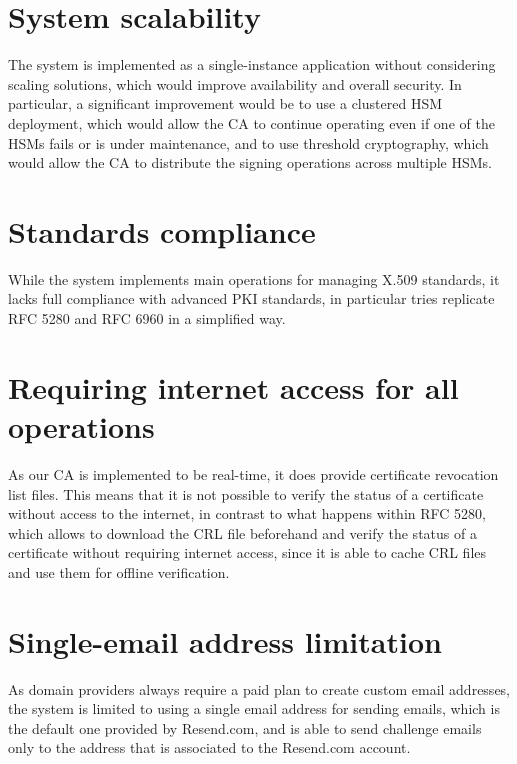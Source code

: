 \section{System scalability}

The system is implemented as a single-instance application without considering scaling solutions, which
would improve availability and overall security. In particular, a significant improvement would be
to use a clustered HSM deployment, which would allow the CA to continue operating even if one of the HSMs
fails or is under maintenance, and to use threshold cryptography, which would allow the CA to distribute
the signing operations across multiple HSMs.

\section{Standards compliance}

While the system implements main operations for managing X.509 standards, it lacks full compliance 
with advanced PKI standards, in particular tries replicate RFC 5280 and RFC 6960 in a simplified way.

\section{Requiring internet access for all operations}
As our CA is implemented to be real-time, it does provide certificate revocation list files. This means 
that it is not possible to verify the status of a certificate without access to the internet, in contrast 
to what happens within RFC 5280, which allows to download the CRL file beforehand and verify the status 
of a certificate without requiring internet access, since it is able to cache CRL files and use them for 
offline verification.

\section{Single-email address limitation}
As domain providers always require a paid plan to create custom email addresses, the system is limited
to using a single email address for sending emails, which is the default one provided by Resend.com, and
is able to send challenge emails only to the address that is associated to the Resend.com account.